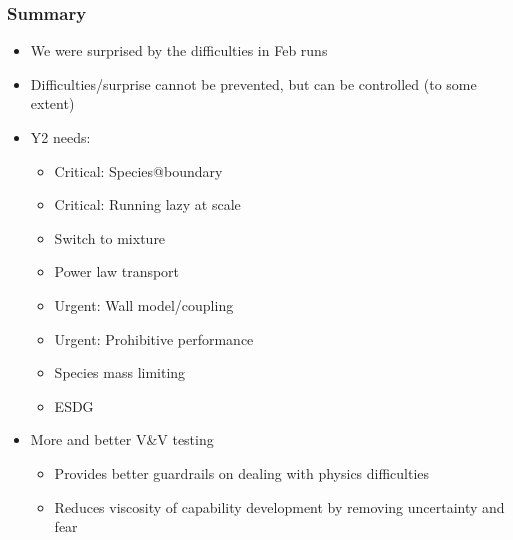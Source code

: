 \begin{frame}\frametitle{Summary}
\begin{center}
\begin{itemize}
\item We were surprised by the difficulties in Feb runs
\item Difficulties/surprise cannot be prevented, but can be controlled (to some extent)
\item Y2 needs:
\begin{multicols}{2}
        \begin{itemize}
        \item Critical: Species@boundary
        \item Critical: Running lazy at scale
        \item Switch to mixture
        \item Power law transport
\columnbreak
        \item Urgent: Wall model/coupling
        \item Urgent: Prohibitive performance
        \item Species mass limiting
        \item ESDG
        \end{itemize}
\end{multicols}
\end{itemize}
\begin{itemize}
\item More and better V\&V testing
      \begin{itemize}
      \item Provides better guardrails on dealing with physics difficulties
      \item Reduces viscosity of capability development by removing uncertainty and fear

\end{itemize}
\end{itemize}
\end{center}
\end{frame}
